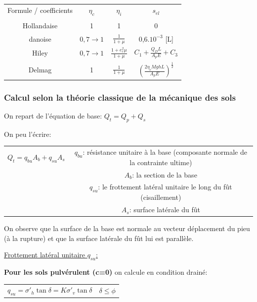         \begin{tabular}{c|c|c|c}
            Formule / coefficients \: \: & $\eta_c$ & $\eta_i$ & $s_{el}$ \\
            & & & \\
             Hollandaise  & 1 & 1 & 0 \\
             danoise  & $0,7 \to 1$ & $\frac{1}{1+\mu}$ & 0,6.$10^{-3}$ [L] \\
             Hiley  & $0,7 \to 1$ & $\frac{1+e_r^2\mu}{1+\mu}$ & $C_1 + \frac{Q_D L}{A_p E} + C_3$ \\
             Delmag & 1 & $\frac{1}{1+\mu}$ & $(\frac{2 \eta_c MghL}{A_pE})^\frac{1}{2}$
        \end{tabular}
        
        \subsubsection{Calcul selon la théorie classique de la mécanique des sols}
        
        On repart de l'équation de base: $Q_t = Q_p + Q_s$ 
        
        On peu l'écrire: 
        
        \begin{center}
        \begin{tabular}{c|c}
            $Q_t = q_{bu}A_b + q_{su}A_s$ \: \: 
            &  $q_{bu}$: résistance unitaire à la base (composante normale de la contrainte ultime)  \\
            &  $A_b$: la section de la base  \\
            &  $q_{su}$: le frottement latéral unitaire le long du fût (cisaillement)  \\
            &  $A_s$: surface latérale du fût  
        \end{tabular}
         \end{center} 
        
        On observe que la surface de la base est normale au vecteur déplacement du pieu (à la rupture) et que la surface latérale du fût lui est parallèle. 
        
        \underline{Frottement latéral unitaire $q_{su}$:} 
        
        \textbf{Pour les sols pulvérulent (c=0)} on calcule en condition drainé:
        
        \begin{center}
        \begin{tabular}{c|c}
            $q_{su} = \sigma'_h \tan \delta = K \sigma'_v \tan \delta $ \: \: \: & $\delta \le \phi $   
        \end{tabular}
        \end{center} 
        
